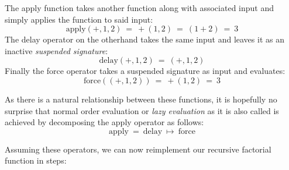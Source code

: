 \documentclass[twoside]{article}
\begin{document}
\noindent The apply function takes another function along with associated input and simply applies the function to said input:
$$ \mbox{apply}(+, 1, 2)\ =\ +(1,2)\ =\ (1 + 2)\ =\ 3 $$
The delay operator on the otherhand takes the same input and leaves it as an inactive \emph{suspended signature}:
$$ \mbox{delay}(+, 1, 2)\ =\ (+, 1, 2) $$
Finally the force operator takes a suspended signature as input and evaluates:
$$ \mbox{force}((+, 1, 2))\ =\ +(1,2)\ =\ 3 $$

As there is a natural relationship between these functions, it is hopefully no surprise that normal order evaluation
or \emph{lazy evaluation} as it is also called is achieved by decomposing the apply operator as follows:
$$ \mbox{apply}\ =\ \mbox{delay}\ \mapsto\ \mbox{force} $$

Assuming these operators, we can now reimplement our recursive factorial function in steps:

\newpage
\end{document}
